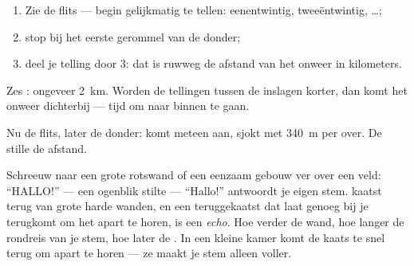 \begin{method}\label{met:g4:how-sound-travels:storm}
\begin{enumerate}
  \item Zie de flits --- begin gelijkmatig  te tellen:
        eenentwintig, tweeëntwintig, \dots;
  \item stop bij het eerste gerommel van de donder;
  \item deel je telling door $3$: dat is ruwweg de afstand van het
        onweer in kilometers.
\end{enumerate}
Zes : ongeveer \qty{2}{km}. Worden de tellingen tussen de
inslagen korter, dan komt het onweer dichterbij --- tijd om naar
binnen te gaan.
\end{method}

\begin{omfigure}

{\small Nu de flits, later de donder:  komt meteen aan,
 sjokt met \qty{340}{m} per  over. De stille 
 de afstand.}
\end{omfigure}

\begin{example}[Echo's]\label{ex:g4:how-sound-travels:echo}
Schreeuw naar een grote rotswand of een eenzaam gebouw ver over een
veld: ``HALLO!'' --- een ogenblik stilte --- ``Hallo!'' antwoordt je
eigen stem.  kaatst terug van grote harde wanden, en een
teruggekaatst  dat laat genoeg bij je terugkomt om het apart te
horen, is een \emph{echo}. Hoe verder de wand, hoe langer
de rondreis van je stem, hoe later de . In een kleine kamer komt de
kaats te snel terug om apart te horen --- ze maakt je stem alleen
voller.
\end{example}

